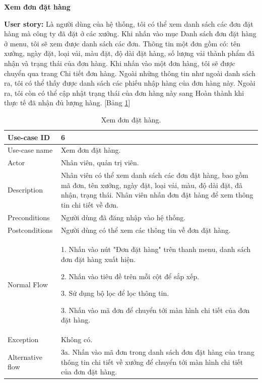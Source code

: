 \textbf{Xem đơn đặt hàng}\par
\textbf{User story:} Là người dùng của hệ thống, tôi có thể xem danh sách các đơn đặt hàng mà công ty đã đặt ở các xưởng. Khi nhấn vào mục Danh sách đơn đặt hàng ở menu, tôi sẽ xem được danh sách các đơn. Thông tin một đơn gồm có: tên xưởng, ngày đặt, loại vải, màu đặt, độ dài đặt hàng, số lượng vải thành phẩm đã nhận và trạng thái của đơn hàng. Khi nhấn vào một đơn hàng, tôi sẽ được chuyển qua trang Chi tiết đơn hàng. Ngoài những thông tin như ngoài danh sách ra, tôi có thể thấy được danh sách các phiếu nhập hàng của đơn hàng này. Ngoài ra, tôi còn có thể cập nhật trạng thái của đơn hàng này sang Hoàn thành khi thực tế đã nhận đủ lượng hàng. [Bảng \ref{bang6}]
\begin{table}[H]
    \centering
    \begin{tabular}{|m{3cm}|m{10cm}|}
    \hline 
        Use-case ID & 6\\ \hline
        Use-case name & Xem đơn đặt hàng.\\ \hline
        Actor & Nhân viên, quản trị viên.\\ \hline
        Description & Nhân viên có thể xem danh sách các đơn đặt hàng, bao gồm mã đơn, tên xưởng, ngày đặt, loại vải, màu, độ dài đặt, đã nhận, trạng thái. Nhân viên nhấn đơn đặt hàng để xem thông tin chi tiết về đơn.\\ \hline
        Preconditions & Người dùng đã đăng nhập vào hệ thống.\\ \hline
        Postconditions & Người dùng có thể xem các thông tin về đơn đặt hàng.\\ \hline
        Normal Flow & 
        1. Nhấn vào nút "Đơn đặt hàng" trên thanh menu, danh sách đơn đặt hàng xuất hiện.\par
        2. Nhấn vào tiêu đề trên mỗi cột để sắp xếp.\par
        3. Sử dụng bộ lọc để lọc thông tin.\par
        3. Nhấn vào mã đơn để chuyển tới màn hình chi tiết của đơn đặt hàng.
        \\ \hline
        Exception & Không có.\\ \hline
        Alternative flow & 
        3a. Nhấn vào mã đơn trong danh sách đơn đặt hàng của trang thông tin chi tiết về xưởng để chuyển tới màn hình chi tiết của đơn đặt hàng.
        \\ 
    \hline 
    \end{tabular}
    \caption{Xem đơn đặt hàng.}
    \label{bang6}
\end{table}



